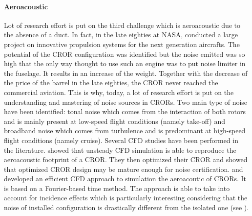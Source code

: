 \paragraph{Aeroacoustic}
Lot of research effort is put on the third challenge which
is aeroacoustic due to the absence of a duct. 
In fact, in the late eighties at NASA, \citet{Hager1988}
conducted a large project on innovative propulsion systems for the
next generation aircrafts. The potential of the CROR configuration
was identified but the noise emitted was so high that the only way
thought to use such an engine was to put noise limiter in the fuselage. It results in 
an increase of the weight. Together with the decrease of the price of the
barrel in the late eighties, the CROR never reached the commercial
aviation. This is why, today, a lot of research effort is put on the
understanding and mastering of noise sources in CRORs.
Two main type of noise have been identified: tonal noise which comes from
the interaction of both rotors and is mainly present at low-speed flight conditions 
(namely take-off)
and broadband noise which comes from turbulence and is predominant
at high-speed flight conditions (namely cruise).
Several CFD studies have been performed in the literature.
\citet{Peters2012} showed that unsteady CFD simulation is able
to reproduce the aeroacoustic footprint of a CROR. They then optimized
their CROR and showed that optimized CROR design may be mature enough
for noise certification. \citet{Hoffer2012} and \citet{Ferrante2013}
developed an efficient CFD approach to simulation the aeroacoutic of CRORs.
It is based on a Fourier-based time method. The approach is able to
take into account for incidence effects which is particularly interesting
considering that the noise of installed configuration is drastically
different from the isolated one (see \citet{Hager1988}).

